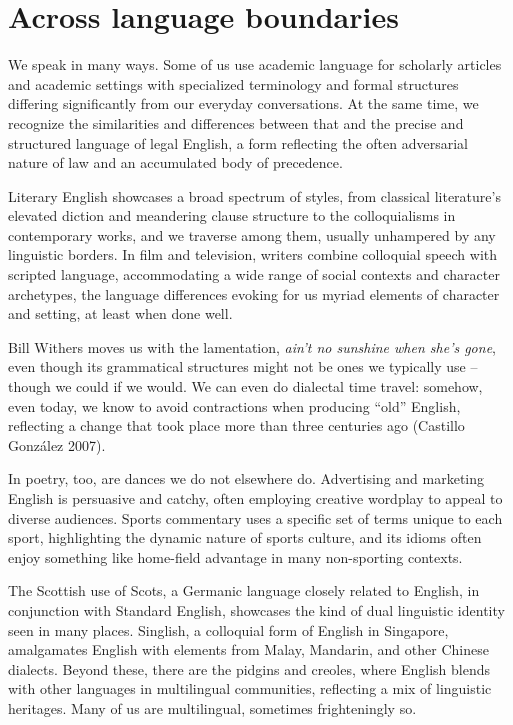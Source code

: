 \chapter{Across language boundaries}

We speak in many ways. Some of us use academic language for scholarly articles and academic settings with specialized terminology and formal structures differing significantly from our everyday conversations. At the same time, we recognize the similarities and differences between that and the precise and structured language of legal English, a form reflecting the often adversarial nature of law and an accumulated body of precedence.

Literary English showcases a broad spectrum of styles, from classical literature's elevated diction and meandering clause structure to the colloquialisms in contemporary works, and we traverse among them, usually unhampered by any linguistic borders. In film and television, writers combine colloquial speech with scripted language, accommodating a wide range of social contexts and character archetypes, the language differences evoking for us myriad elements of character and setting, at least when done well. 

Bill Withers moves us with the lamentation, \textit{ain't no sunshine when she's gone}, even though its grammatical structures might not be ones we typically use -- though we could if we would. We can even do dialectal time travel: somehow, even today, we know to avoid contractions when producing ``old'' English, reflecting a change that took place more than three centuries ago (Castillo González 2007). 

In poetry, too, are dances we do not elsewhere do. Advertising and marketing English is persuasive and catchy, often employing creative wordplay to appeal to diverse audiences. Sports commentary uses a specific set of terms unique to each sport, highlighting the dynamic nature of sports culture, and its idioms often enjoy something like home-field advantage in many non-sporting contexts.

The Scottish use of Scots, a Germanic language closely related to English, in conjunction with Standard English, showcases the kind of dual linguistic identity seen in many places. Singlish, a colloquial form of English in Singapore, amalgamates English with elements from Malay, Mandarin, and other Chinese dialects. Beyond these, there are the pidgins and creoles, where English blends with other languages in multilingual communities, reflecting a mix of linguistic heritages. Many of us are multilingual, sometimes frighteningly so.


